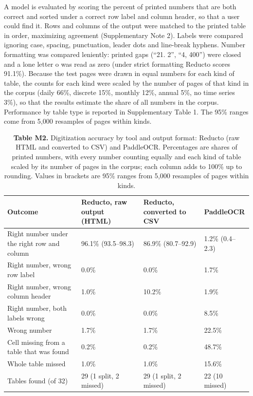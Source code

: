 A model is evaluated by scoring the percent of printed numbers that are both correct and sorted under a correct row label and column header, so that a user could find it. Rows and columns of the output were matched to the printed table in order, maximizing agreement (Supplementary Note 2). Labels were compared ignoring case, spacing, punctuation, leader dots and line-break hyphens. Number formatting was compared leniently: printed gaps (``21. 2'', ``4, 400'') were closed and a lone letter o was read as zero (under strict formatting Reducto scores 91.1\%). Because the test pages were drawn in equal numbers for each kind of table, the counts for each kind were scaled by the number of pages of that kind in the corpus (daily 66\%, discrete 15\%, monthly 12\%, annual 5\%, no time series 3\%), so that the results estimate the share of all numbers in the corpus. Performance by table type is reported in Supplementary Table 1. The 95\% ranges come from 5,000 resamples of pages within kinds.

\begin{table}[htbp]
\centering
\small

\caption*{\textbf{Table M2.} Digitization accuracy by tool and output format: Reducto (raw HTML and converted to CSV) and PaddleOCR. Percentages are shares of printed numbers, with every number counting equally and each kind of table scaled by its number of pages in the corpus; each column adds to 100\% up to rounding. Values in brackets are 95\% ranges from 5,000 resamples of pages within kinds.}
\begin{tabularx}{\textwidth}{>{\raggedright\arraybackslash\hspace{0pt}}X>{\raggedright\arraybackslash\hspace{0pt}}X>{\raggedright\arraybackslash\hspace{0pt}}X>{\raggedright\arraybackslash\hspace{0pt}}X}
\toprule
\textbf{Outcome} & \textbf{Reducto, raw output (HTML)} & \textbf{Reducto, converted to CSV} & \textbf{PaddleOCR} \\
\midrule
Right number under the right row and column & 96.1\% (93.5--98.3) & 86.9\% (80.7--92.9) & 1.2\% (0.4--2.3) \\
Right number, wrong row label & 0.0\% & 0.0\% & 1.7\% \\
Right number, wrong column header & 1.0\% & 10.2\% & 1.9\% \\
Right number, both labels wrong & 0.0\% & 0.0\% & 8.5\% \\
Wrong number & 1.7\% & 1.7\% & 22.5\% \\
Cell missing from a table that was found & 0.2\% & 0.2\% & 48.7\% \\
Whole table missed & 1.0\% & 1.0\% & 15.6\% \\
Tables found (of 32) & 29 (1 split, 2 missed) & 29 (1 split, 2 missed) & 22 (10 missed) \\
\bottomrule
\end{tabularx}
\end{table}

